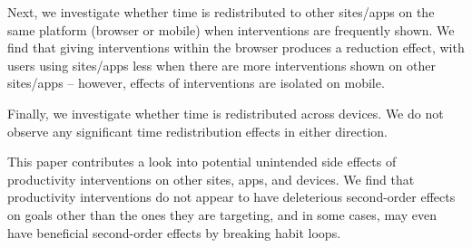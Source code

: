 Next, we investigate whether time is redistributed to other sites/apps on the same platform (browser or mobile) when interventions are frequently shown. We find that giving interventions within the browser produces a reduction effect, with users using sites/apps less when there are more interventions shown on other sites/apps -- however, effects of interventions are isolated on mobile. %

Finally, we investigate whether time is redistributed across devices. We do not observe any significant time redistribution effects in either direction.


This paper contributes a look into potential unintended side effects of productivity interventions on other sites, apps, and devices. We find that productivity interventions do not appear to have deleterious second-order effects on goals other than the ones they are targeting, and in some cases, may even have beneficial second-order effects by breaking habit loops.

